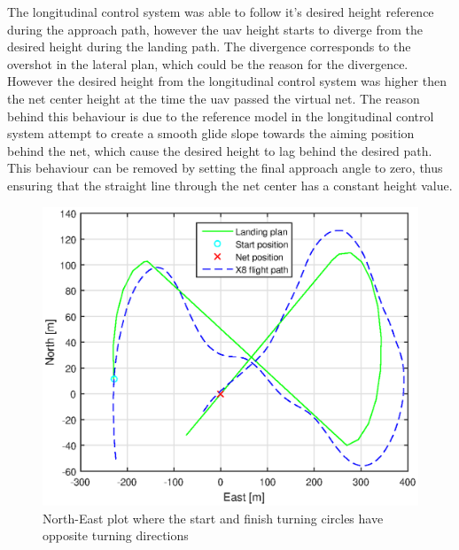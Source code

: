 The longitudinal control system was able to follow it's desired height reference during the approach path, however the \gls{uav} height starts to diverge from the desired height during the landing path. The divergence corresponds to the overshot in the lateral plan, which could be the reason for the divergence. However the desired height from the longitudinal control system was higher then the net center height at the time the \gls{uav} passed the virtual net. The reason behind this behaviour is due to the reference model in the longitudinal control system attempt to create a smooth glide slope towards the aiming position behind the net, which cause the desired height to lag behind the desired path. This behaviour can be removed by setting the final approach angle to zero, thus ensuring that the straight line through the net center has a constant height value.
\begin{figure}[H]
	\centering
		\includegraphics[scale=0.7]{figs/Experiment/NorthEast31mai103029.eps}
		\caption{North-East plot where the start and finish turning circles have opposite turning directions}
		\label{Fig:NorthEast31mai103029}
\end{figure}
